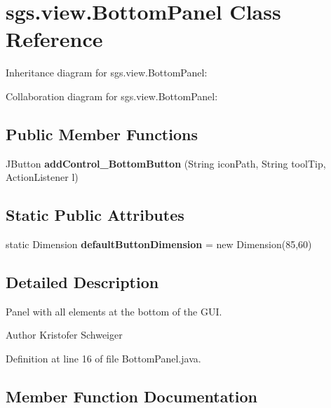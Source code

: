 \section{sgs.\-view.\-Bottom\-Panel Class Reference}
\label{classsgs_1_1view_1_1_bottom_panel}


Inheritance diagram for sgs.\-view.\-Bottom\-Panel\-:


Collaboration diagram for sgs.\-view.\-Bottom\-Panel\-:
\subsection*{Public Member Functions}
\begin{DoxyCompactItemize}
\item 
J\-Button {\bf add\-Control\-\_\-\-Bottom\-Button} (String icon\-Path, String tool\-Tip, Action\-Listener l)
\end{DoxyCompactItemize}
\subsection*{Static Public Attributes}
\begin{DoxyCompactItemize}
\item 
static Dimension {\bf default\-Button\-Dimension} = new Dimension(85,60)
\end{DoxyCompactItemize}


\subsection{Detailed Description}
Panel with all elements at the bottom of the G\-U\-I.

\begin{DoxyAuthor}{Author}
Kristofer Schweiger 
\end{DoxyAuthor}


Definition at line 16 of file Bottom\-Panel.\-java.



\subsection{Member Function Documentation}
